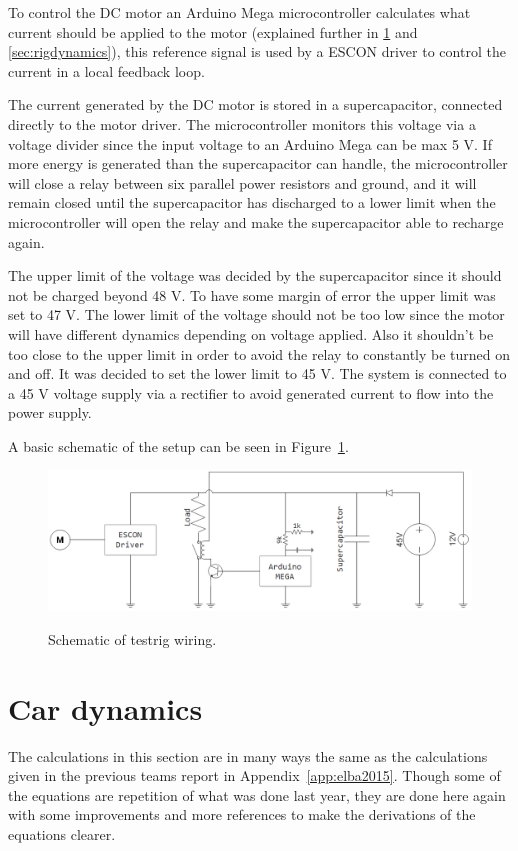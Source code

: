 To control the DC motor an Arduino Mega microcontroller
calculates what current should be applied to the motor (explained further in \ref{sec:cardynamics} and \ref{sec:rigdynamics}), this reference signal
is used by a ESCON driver to control the current in a local feedback loop.

The current generated by the DC motor is stored in a supercapacitor, connected directly to the motor driver. The microcontroller monitors this voltage via a voltage divider since the input voltage to an Arduino Mega can be max 5 V. If more energy is generated than the supercapacitor can handle, the microcontroller will close a relay between six parallel power resistors and ground, and it will remain closed until the supercapacitor has discharged to a lower limit when the microcontroller will open the relay and make the supercapacitor able to recharge again. 

The upper limit of the voltage was decided by the supercapacitor since it should not be charged beyond 48 V. To have some margin of error the upper limit was set to 47 V. The lower limit of the voltage should not be too low since the motor will have different dynamics depending on voltage applied. Also it shouldn't be too close to the upper limit in order to avoid the relay to constantly be turned on and off. It was decided to set the lower limit to 45 V. The system is connected to a 45 V voltage supply via a rectifier to avoid generated current to flow into the power supply.

A basic schematic of the setup can be seen in
Figure~\ref{fig:testrig_schematic}.

\begin{figure}[H]
    \centering\label{fig:testrig_schematic}
    \includegraphics[width=\textwidth]{./img/testrig_schematic.png}
    \caption{Schematic of testrig wiring.}
\end{figure}

\section{Car dynamics}\label{sec:cardynamics}
The calculations in this section are in many ways the same as the calculations
given in the previous teams report in Appendix~\ref{app:elba2015}. Though some
of the equations are repetition of what was done last year, they are
done here again with some improvements and more references to make the
derivations of the equations clearer.

